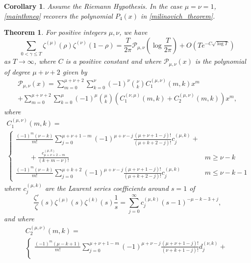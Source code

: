 \documentclass[10pt,a4paper]{amsart}
\newtheorem{theorem}{Theorem}
\newtheorem{corollary}{Corollary}
\begin{document}
\begin{corollary} \label{cor:micah}
    Assume the Riemann Hypothesis. In the case $\mu=\nu=1$, \eqref{mainthmeq} recovers the polynomial $P_4(x)$ in \eqref{milinovich_theorem}.
\end{corollary}

\begin{theorem}\label{mainthm}
    For positive integers $\mu,\nu$, we have 
    \begin{equation}\label{mainthmeq}
        \sum_{0<\gamma\le T}\zeta^{(\mu)}(\rho)\zeta^{(\nu)}(1-\rho)=\frac{T}{2\pi}\mathcal{P}_{\mu,\nu}\left(\log\frac{T}{2\pi}\right)+O\left(Te^{-C\sqrt{\log T}}\right)
    \end{equation}
    as $T\to\infty$, where $C$ is a positive constant and where $\mathcal{P}_{\mu,\nu}(x)$ is the polynomial of degree $\mu+\nu+2$ given by
    \begin{multline}\label{eq:poly}
        \mathcal{P}_{\mu,\nu}(x) = \sum_{m=0}^{\mu+\nu+2} \sum_{k=0}^{\nu}  (-1)^{\nu}  \binom{\nu}{k} C_1^{(\mu,\nu)}(m,k)x^m\\
        +\sum_{m=0}^{\mu+\nu+2} \sum_{k=0}^{\mu}  (-1)^{\mu}  \binom{\mu}{k} \left(C_1^{(\nu,\mu)}(m,k)+C_2^{(\mu,\nu)}(m,k)\right)x^m,
    \end{multline}
    where
\begin{multline*}
C_1^{(\mu,\nu)}(m,k) = \\
\begin{cases} 
\displaystyle \frac{(-1)^m(\nu-k)}{m!} \sum_{j=0}^{\mu+\nu+1-m}  (-1)^{\mu+\nu-j} \frac{ (\mu+\nu+1-j)! }{(\mu+k+2-j)!} c^{(\mu,k)}_{j} +\\
\displaystyle \qquad + \frac{c^{(\mu,k)}_{\mu+\nu+2-m}}{(k+m-\nu)!} &  m \geq \nu-k \\[3ex]
\displaystyle \frac{(-1)^m(\nu-k)}{m!} \sum_{j=0}^{\mu+k+2}  (-1)^{\mu+\nu-j} \frac{ (\mu+\nu+1-j)! }{(\mu+k+2-j)!} c^{(\mu,k)}_{j}  & m \leq \nu -k-1
\end{cases}
\end{multline*}
where $c^{(\mu,k)}_{j}$ are the Laurent series coefficients around $s=1$ of \begin{equation}
    \frac{\zeta'}{\zeta}(s)\zeta^{(\mu)}(s)\zeta^{(k)}(s)\frac{1}{s}=\sum_{j=0}^{\infty}c^{(\mu,k)}_{j}(s-1)^{-\mu-k-3+j} ,
\end{equation}
    and  where
\begin{multline*}
    C_2^{(\mu,\nu)}(m,k) = \\
\begin{cases} 
\displaystyle  \frac{(-1)^m(\mu-k+1)}{m!} \sum_{j=0}^{\mu+\nu+1-m} (-1)^{\mu+\nu-j}  \frac{(\mu+\nu+1-j)!}{(\nu+k+1-j)!} d_{j}^{(\nu,k)} +  \\

\end{cases}
\end{multline*}
\end{theorem}
\end{document}
